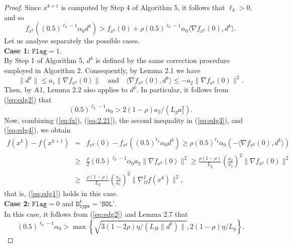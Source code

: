 \documentclass[11pt]{article}
\begin{document}
\begin{proof}
Since $x^{k+1}$ is computed by Step 4 of Algorithm 5, it follows that $\ell_{k}>0$, and so
\begin{equation}
f_{x^{k}}((0.5)^{\ell_{k}-1}\alpha_{0}d^{k})>f_{x^{k}}(0)+\rho(0.5)^{\ell_{k}-1}\alpha_{0}\langle\nabla f_{x^{k}}(0),d^{k}\rangle.
\label{eq:edg2}
\end{equation}
Let us analyse separately the possible cases.
\\[0.2cm]
\noindent\textbf{Case 1:} $\texttt{Flag}=1$.
\\[0.2cm]
\noindent By Step 1 of Algorithm 5, $d^{k}$ is defined by the same correction procedure employed in Algorithm 2. Consequently, by Lemma 2.1 we have
\begin{equation}
\|d^{k}\|\leq a_{1}\|\nabla f_{x^{k}}(0)\|\quad\text{and}\quad \langle\nabla f_{x^{k}}(0),d^{k}\rangle\leq -a_{2}\|\nabla f_{x^{k}}(0)\|^{2}.
\label{eq:edg3}
\end{equation}
Then, by A1, Lemma 2.2 also applies to $d^{k}$. In particular, it follows from (\ref{eq:edg2}) that
\begin{equation}
(0.5)^{\ell_{k}-1}\alpha_{0}> 2(1-\rho)a_{2} / (L_{g}a_{1}^{2}).
\label{eq:edg4}
\end{equation}
Now, combining (\ref{eq:fx}), (\ref{eq:2.21}), the second inequality in (\ref{eq:edg3}), and (\ref{eq:edg4}), we obtain
\small
\begin{eqnarray*}
f(x^{k})-f(x^{k+1})&=& f_{x^{k}}(0)-f_{x^{k}}((0.5)^{\ell_{k}}\alpha_{0}d^{k})\geq\rho (0.5)^{\ell_{k}}\alpha_{0}\left(-\langle\nabla f_{x^{k}}(0),d^{k}\rangle\right)\\
&\geq &\frac{\rho}{2}(0.5)^{\ell_{k}-1}\alpha_{0}a_{2}\|\nabla f_{x^{k}}(0)\|^{2}\geq\frac{\rho(1-\rho)}{L_{g}}\left(\frac{a_{2}}{a_{1}}\right)^{2}\|\nabla f_{x^{k}}(0)\|^{2}\\
&\geq &\frac{\rho (1-\rho)}{L_{g}}\left(\frac{a_{2}}{a_{1}}\right)^{2}\|\nabla_{\Omega}^{I}f(x^{k})\|^{2},
\end{eqnarray*}
\normalsize
that is, (\ref{eq:edg1}) holds in this case.
\\[0.2cm]
\noindent\textbf{Case 2:} $\texttt{Flag}=0$ and $\texttt{D}_{\texttt{type}}^{k}=\texttt{`SOL'}$.
\\[0.2cm]
\noindent In this case, it follows from (\ref{eq:edg2}) and Lemma 2.7 that
\small
\begin{equation}
(0.5)^{\ell_{k}-1}\alpha_{0}>\max\left\{\sqrt{3(1-2\rho)\eta/(L_{H}\|d^{k})\|},2(1-\rho)\eta/L_{g}\right\}.
\label{eq:edg5}
\end{equation}

\end{proof}
\end{document}
